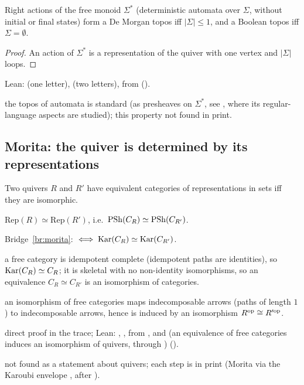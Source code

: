 \begin{corollary}\label{co:automata}
Right actions of the free monoid $\Sigma^*$ (deterministic automata over $\Sigma$, without initial or final states) form a De Morgan topos iff $|\Sigma|\le 1$, and a Boolean topos iff $\Sigma = \emptyset$.
\end{corollary}

\begin{proof}
An action of $\Sigma^*$ is a representation of the quiver with one vertex and $|\Sigma|$ loops.
\end{proof}

\begin{trace}
\item[verify] Lean:  (one letter),  (two letters), from  ().
\item[novelty] the topos of automata is standard (as presheaves on $\Sigma^*$, see \cite[Prop.~2.2]{hora-automata}, where its regular-language aspects are studied); this property not found in print.
\end{trace}

\subsection{Morita: the quiver is determined by its representations}

\begin{theorem}\label{th:quivermorita}
Two quivers $R$ and $R'$ have equivalent categories of representations in sets iff they are isomorphic.
\end{theorem}

\begin{trace}
\item[deck] $\mathrm{Rep}(R)\simeq\mathrm{Rep}(R')$, i.e.\ $\mathrm{PSh}(C_R)\simeq\mathrm{PSh}(C_{R'})$.
\item[arch] Bridge~\ref{br:morita}: $\iff\operatorname{Kar}(C_R)\simeq\operatorname{Kar}(C_{R'})$.
\item[specialise] a free category is idempotent complete (idempotent paths are identities), so $\operatorname{Kar}(C_R)\simeq C_R$; it is skeletal with no non-identity isomorphisms, so an equivalence $C_R\simeq C_{R'}$ is an isomorphism of categories.
\item[rewrite] an isomorphism of free categories maps indecomposable arrows (paths of length $1$) to indecomposable arrows, hence is induced by an isomorphism $R^{\mathrm{op}}\cong R'^{\mathrm{op}}$.
\item[verify] direct proof in the trace; Lean: , , from ,  and  (an equivalence of free categories induces an isomorphism of quivers, through ) ().
\item[novelty] not found as a statement about quivers; each step is in print (Morita via the Karoubi envelope \cite[Lemma~1.1.3]{rogers-thesis}, after \cite[A1.1.9--10]{elephant}).
\end{trace}

